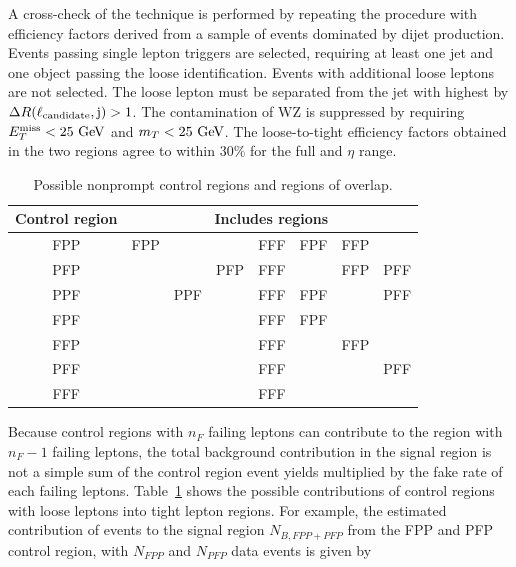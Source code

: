 A cross-check of the technique is performed by 
repeating the procedure with efficiency factors derived from a 
sample of events dominated by dijet production. 
Events passing single lepton triggers are selected, requiring at least one jet and one
{\lcand} object passing the loose identification. Events with additional loose leptons are not selected.
The loose lepton must be separated from the jet with highest \pt by $\Delta R(\ell_{\rm candidate}, \mathrm{j}) > 1$.
The contamination of WZ is suppressed by requiring $E_T^{\text{miss}} < 25\,\,\text{Ge\hspace{-.08em}V}$  and  $m_T < 25\,\,\text{Ge\hspace{-.08em}V}$. 
The loose-to-tight efficiency factors obtained in the two regions
agree to within 30\% for the full \PT and $\eta$ range.

\begin{table}[htbp]
    \centering
    \begin{tabular}{|c|c|c|c|c|c|c|c| }
\hline %
Control region &  \multicolumn{7}{c|}{Includes regions}                                                                 \\
\hline %
FPP & FPP &     &     & FFF & FPF & FFP &        \\
PFP &     &     & PFP & FFF &     & FFP & PFF    \\
PPF &     & PPF &     & FFF & FPF &     & PFF    \\
FPF &     &     &     & FFF & FPF &     &        \\
FFP &     &     &     & FFF &     & FFP &        \\
PFF &     &     &     & FFF &     &     & PFF    \\
FFF &     &     &     & FFF &     &     &        \\
\hline %
     \end{tabular}
    \caption{ Possible nonprompt control regions and regions of overlap.}
    \label{tab:nonpromptRegionOverlap}
\end{table}

Because control regions with $n_{F}$ failing leptons can contribute to the region with
$n_{F}-1$ failing leptons,
the total background contribution in the signal region is not a simple sum of the 
control region event yields multiplied by the fake rate of each failing leptons. 
Table~\ref{tab:nonpromptRegionOverlap} shows the possible contributions 
of control regions with loose leptons into tight lepton regions.
For example,
the estimated contribution of events to the signal region $N_{B,FPP+PFP}$ 
from the FPP and PFP control region, with $N_{FPP}$ and $N_{PFP}$ data events is given by

